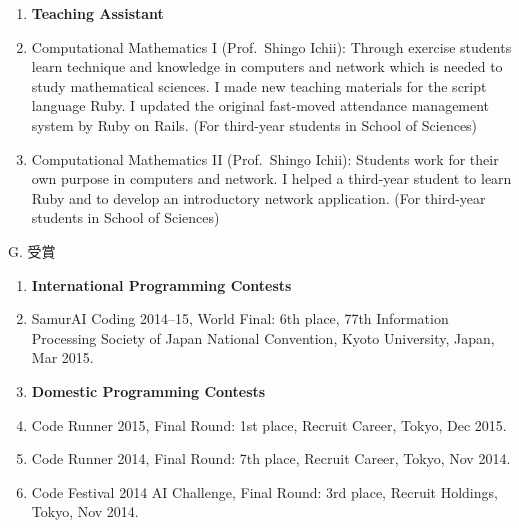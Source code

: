 \documentclass[a4j,twocolumn]{jarticle}
\begin{document}

\begin{enumerate}
\item[] {\bf Teaching Assistant}
\item Computational Mathematics I (Prof.~Shingo Ichii):
      Through exercise students learn
      technique and knowledge in computers and network
      which is needed to study mathematical sciences.
      I made new teaching materials for the script language Ruby.
      I updated the original fast-moved attendance management system
      by Ruby on Rails. 
      (For third-year students in School of Sciences)
\item Computational Mathematics II (Prof.~Shingo Ichii): 
      Students work for their own purpose in computers and network.
      I helped a third-year student to learn Ruby and
      to develop an introductory network application.
      (For third-year students in School of Sciences)
\end{enumerate}

\vspace{0.2cm}
\noindent
G. 受賞

\vspace{0.1cm}

\begin{enumerate}
 \item[] {\bf International Programming Contests}
 \item SamurAI Coding 2014--15, World Final: 6th place, 77th Information
       Processing Society of Japan National Convention, Kyoto
       University, Japan, Mar 2015.
 \item[] {\bf Domestic Programming Contests}
 \item Code Runner 2015, Final Round: 1st place,
       Recruit Career, Tokyo, Dec 2015.
 \item Code Runner 2014, Final Round: 7th place,
       Recruit Career, Tokyo, Nov 2014.
 \item Code Festival 2014 AI Challenge, Final Round: 3rd place,
       Recruit Holdings, Tokyo, Nov 2014.
\end{enumerate}
\end{document}
